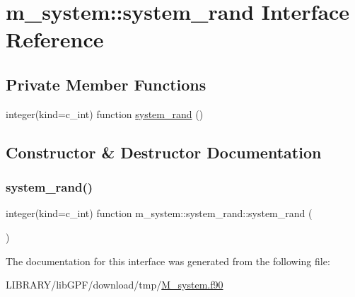 \hypertarget{interfacem__system_1_1system__rand}{}\section{m\+\_\+system\+:\+:system\+\_\+rand Interface Reference}
\label{interfacem__system_1_1system__rand}
\subsection*{Private Member Functions}
\begin{DoxyCompactItemize}
\item 
integer(kind=c\+\_\+int) function \hyperlink{interfacem__system_1_1system__rand_a35d3d17489a09dede93091bdc4ab69e0}{system\+\_\+rand} ()
\end{DoxyCompactItemize}


\subsection{Constructor \& Destructor Documentation}
\mbox{\label{interfacem__system_1_1system__rand_a35d3d17489a09dede93091bdc4ab69e0}} 
\subsubsection{\texorpdfstring{system\+\_\+rand()}{system\_rand()}}
{\footnotesize\ttfamily integer(kind=c\+\_\+int) function m\+\_\+system\+::system\+\_\+rand\+::system\+\_\+rand (\begin{DoxyParamCaption}{ }\end{DoxyParamCaption})\hspace{0.3cm}{\ttfamily [private]}}



The documentation for this interface was generated from the following file\+:\begin{DoxyCompactItemize}
\item 
L\+I\+B\+R\+A\+R\+Y/lib\+G\+P\+F/download/tmp/\hyperlink{M__system_8f90}{M\+\_\+system.\+f90}\end{DoxyCompactItemize}
